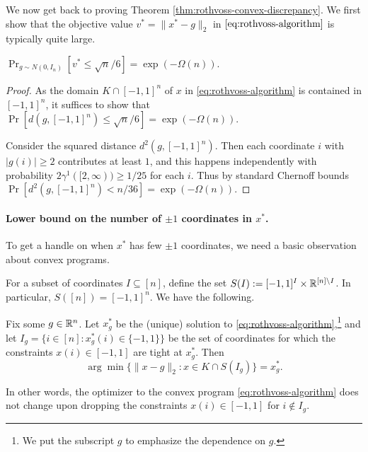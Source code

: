 We now get back to proving Theorem \ref{thm:rothvoss-convex-discrepancy}.
We first show that the objective value $v^*=\|x^*-g\|_2$ in $\eqref{eq:rothvoss-algorithm}$ is typically quite large. 
 \begin{lemma}
 \label{lm:ch4:large-value}
        $\Pr_{g \sim N(0,I_n)}[v^* \leq  \sqrt{n}/6 ] = \exp(-\Omega(n))$.
        
    \end{lemma}
\begin{proof}
As the domain $K \cap [-1,1]^n$ of $x$ in \eqref{eq:rothvoss-algorithm} is contained in  $[-1,1]^n$, it suffices to show that $\Pr[d(g,[-1,1]^n) \leq \sqrt{n}/6] = \exp(-\Omega(n))$.

Consider the squared  distance $d^2(g,[-1,1]^n) $.
Then each coordinate $i$ with $|g(i)|\geq 2$ contributes at least $1$, and this happens independently with probability $2 \gamma^1([2,\infty)) \geq 1/25$ for each $i$. Thus by standard Chernoff bounds $\Pr[d^2(g,[-1,1]^n) < n/36] = \exp(-\Omega(n))$.
\end{proof}

 \paragraph{Lower bound on the number of $\pm 1$ coordinates in $x^*$.}
To get a handle on when $x^*$ has few $\pm 1$ coordinates, we need a basic observation about convex programs.


For a subset of coordinates $I \subseteq [n]$,
define the set $S(I):= %
[-1,1]^I \times \R^{[n]\setminus I}$. In particular, $S([n])=[-1,1]^n$.  We have the following.
\begin{lemma}
\label{lm:ch4-rothvoss-convex}
    Fix some $g \in \mathbb{R}^n$. Let $x_g^*$ be the (unique) solution to \eqref{eq:rothvoss-algorithm},\footnote{We put the subscript $g$ to emphasize the dependence on $g$.} and let $I_g = \{i \in [n]: x_g^*(i) \in \{-1,1\}\}$ be the set of coordinates for which the constraints $x(i) \in [-1,1]$ are tight at $x_g^*$. Then \[\arg\min\{ \|x-g\|_2: x \in K \cap S(I_g)\} = x_g^*.\]

In other words, the optimizer to the convex program \eqref{eq:rothvoss-algorithm}  does not change upon dropping the constraints $x(i) \in [-1,1]$ for $i \notin I_g$.
\end{lemma}


